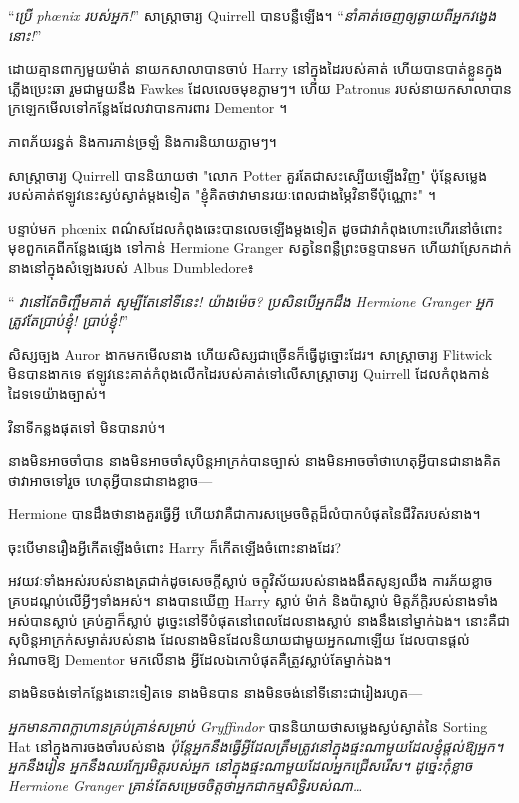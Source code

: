 “\emph{ប្រើ phœnix របស់អ្នក!}” សាស្ត្រាចារ្យ Quirrell បានបន្លឺឡើង។ “\emph{នាំ​គាត់​ចេញ​ឲ្យ​ឆ្ងាយ​ពី​អ្នក​វង្វេង​នោះ!}”

ដោយគ្មានពាក្យមួយម៉ាត់ នាយកសាលាបានចាប់ Harry នៅក្នុងដៃរបស់គាត់ ហើយបានបាត់ខ្លួនក្នុងភ្លើងប្រេះឆា រួមជាមួយនឹង Fawkes ដែលលេចមុខភ្លាមៗ។ ហើយ Patronus របស់នាយកសាលាបានក្រឡេកមើលទៅកន្លែងដែលវាបានការពារ Dementor ។

ភាពភ័យរន្ធត់ និងការភាន់ច្រឡំ និងការនិយាយភ្លាមៗ។

សាស្ត្រាចារ្យ Quirrell បាននិយាយថា "លោក Potter គួរតែជាសះស្បើយឡើងវិញ" ប៉ុន្តែសម្លេងរបស់គាត់ឥឡូវនេះស្ងប់ស្ងាត់ម្តងទៀត "ខ្ញុំគិតថាវាមានរយៈពេលជាងម្ភៃវិនាទីប៉ុណ្ណោះ" ។

បន្ទាប់មក phœnix ពណ៌សដែលកំពុងឆេះបានលេចឡើងម្តងទៀត ដូចជាវាកំពុងហោះហើរនៅចំពោះមុខពួកគេពីកន្លែងផ្សេង ទៅកាន់ Hermione Granger សត្វនៃពន្លឺព្រះចន្ទបានមក ហើយវាស្រែកដាក់នាងនៅក្នុងសំឡេងរបស់ Albus Dumbledore៖

“\emph{ វានៅតែចិញ្ចឹមគាត់ សូម្បីតែនៅទីនេះ! យ៉ាងម៉េច? ប្រសិនបើអ្នកដឹង Hermione Granger អ្នកត្រូវតែប្រាប់ខ្ញុំ! ប្រាប់ខ្ញុំ!}”

សិស្សច្បង Auror ងាកមកមើលនាង ហើយសិស្សជាច្រើនក៏ធ្វើដូច្នោះដែរ។ សាស្រ្តាចារ្យ Flitwick មិនបានងាកទេ ឥឡូវនេះគាត់កំពុងលើកដៃរបស់គាត់ទៅលើសាស្រ្តាចារ្យ Quirrell ដែលកំពុងកាន់ដៃទទេយ៉ាងច្បាស់។

វិនាទីកន្លងផុតទៅ មិនបានរាប់។

នាង​មិន​អាច​ចាំ​បាន នាង​មិន​អាច​ចាំ​សុបិន្ត​អាក្រក់​បាន​ច្បាស់ នាង​មិន​អាច​ចាំ​ថា​ហេតុ​អ្វី​បាន​ជា​នាង​គិត​ថា​វា​អាច​ទៅ​រួច ហេតុ​អ្វី​បាន​ជា​នាង​ខ្លាច—

Hermione បានដឹងថានាងគួរធ្វើអ្វី ហើយវាគឺជាការសម្រេចចិត្តដ៏លំបាកបំផុតនៃជីវិតរបស់នាង។

ចុះ​បើ​មាន​រឿង​អ្វី​កើត​ឡើង​ចំពោះ Harry ក៏​កើត​ឡើង​ចំពោះ​នាង​ដែរ?

អវយវៈ​ទាំង​អស់​របស់​នាង​ត្រជាក់​ដូច​សេចក្ដី​ស្លាប់ ចក្ខុវិស័យ​របស់​នាង​ងងឹត​សូន្យ​ឈឹង ការ​ភ័យ​ខ្លាច​គ្រប​ដណ្ដប់​លើ​អ្វីៗ​ទាំង​អស់។ នាងបានឃើញ Harry ស្លាប់ ម៉ាក់ និងប៉ាស្លាប់ មិត្តភ័ក្តិរបស់នាងទាំងអស់បានស្លាប់ គ្រប់គ្នាក៏ស្លាប់ ដូច្នេះនៅទីបំផុតនៅពេលដែលនាងស្លាប់ នាងនឹងនៅម្នាក់ឯង។ នោះគឺជាសុបិន្តអាក្រក់សម្ងាត់របស់នាង ដែលនាងមិនដែលនិយាយជាមួយអ្នកណាឡើយ ដែលបានផ្តល់អំណាចឱ្យ Dementor មកលើនាង អ្វីដែលឯកោបំផុតគឺត្រូវស្លាប់តែម្នាក់ឯង។

នាង​មិន​ចង់​ទៅ​កន្លែង​នោះ​ទៀត​ទេ នាង​មិន​បាន នាង​មិន​ចង់​នៅ​ទីនោះ​ជា​រៀង​រហូត—

\emph{អ្នកមានភាពក្លាហានគ្រប់គ្រាន់សម្រាប់ Gryffindor} បាននិយាយថាសម្លេងស្ងប់ស្ងាត់នៃ Sorting Hat នៅក្នុងការចងចាំរបស់នាង \emph{ប៉ុន្តែអ្នកនឹងធ្វើអ្វីដែលត្រឹមត្រូវនៅក្នុងផ្ទះណាមួយដែលខ្ញុំផ្តល់ឱ្យអ្នក។ អ្នកនឹងរៀន អ្នកនឹងឈរក្បែរមិត្តរបស់អ្នក នៅក្នុងផ្ទះណាមួយដែលអ្នកជ្រើសរើស។ ដូច្នេះកុំខ្លាច Hermione Granger គ្រាន់តែសម្រេចចិត្តថាអ្នកជាកម្មសិទ្ធិរបស់ណា…}

